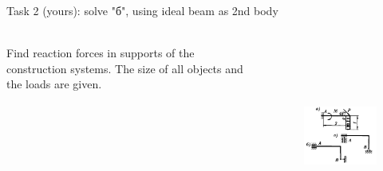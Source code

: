 \documentclass[aspectratio=169]{beamer}
\begin{document}
    \begin{frame}[t]{Task 2 (yours): solve "б", using ideal beam as 2nd body}
        \framesubtitle{}
        \begin{columns}[T,onlytextwidth]
            \begin{column}{0.49\textwidth}
                Find reaction forces in supports of the construction systems. The size of all objects and the loads are given.
            \end{column}
            \begin{column}{0.49\textwidth}
                \begin{figure}[H]
                    \centering\includegraphics[height=6cm,width=1\textwidth,keepaspectratio]{image21.png}
                \end{figure}
            \end{column}
        \end{columns}
        \end{frame}
\end{document}
